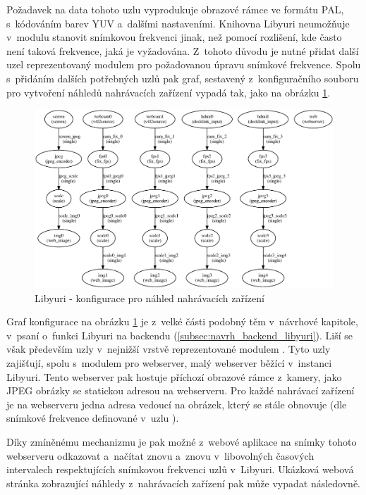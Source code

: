 \documentclass[thesis=M,czech]{FITthesis}[2012/06/26]
\begin{document}
Požadavek na data tohoto uzlu vyprodukuje obrazové rámce ve formátu PAL, s~kódováním barev YUV a~dalšími nastaveními. Knihovna Libyuri neumožňuje v~modulu  stanovit snímkovou frekvenci jinak, než pomocí rozlišení, kde často není taková frekvence, jaká je vyžadována. Z~tohoto důvodu je nutné přidat další uzel reprezentovaný modulem  pro požadovanou úpravu snímkové frekvence. Spolu s~přidáním dalších potřebných uzlů pak graf, sestavený z~konfiguračního souboru pro vytvoření náhledů nahrávacích zařízení vypadá tak, jako na obrázku \ref{img:impl_funkce_preview_conf}.
\\
\begin{figure}[h]\centering
	\includegraphics[width=1\textwidth]{images/ulab_cam_preview.eps}
	\caption{Libyuri - konfigurace pro náhled nahrávacích zařízení}\label{img:impl_funkce_preview_conf}
\end{figure}

Graf konfigurace na obrázku \ref{img:impl_funkce_preview_conf} je z~velké části podobný těm v~návrhové kapitole, v~psaní o~funkci Libyuri na backendu (\ref{subsec:navrh_backend_libyuri}). Liší se však především uzly v~nejnižší vrstvě reprezentované modulem . Tyto uzly zajišťují, spolu s~modulem pro webserver, malý webserver běžící v~instanci Libyuri. Tento webserver pak hostuje příchozí obrazové rámce z~kamery, jako JPEG obrázky se statickou adresou na webserveru. Pro každé nahrávací zařízení je na webserveru jedna adresa vedoucí na obrázek, který se stále obnovuje (dle snímkové frekvence definované v~uzlu ).

Díky zmíněnému mechanizmu je pak možné z~webové aplikace na snímky tohoto webserveru odkazovat a~načítat znovu a~znovu v~libovolných časových intervalech respektujících snímkovou frekvenci uzlů v~Libyuri. Ukázková webová stránka zobrazující náhledy z~nahrávacích zařízení pak může vypadat následovně.\\
\end{document}
